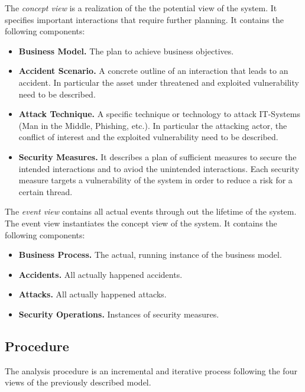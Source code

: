 The \emph{concept view} is a realization of the the potential view of the system.
It specifies important interactions that require further planning.
It contains the following components:
\begin{itemize}
\item \textbf{Business Model.}
The plan to achieve business objectives.

\item \textbf{Accident Scenario.}
A concrete outline of an interaction that leads to an accident.
In particular the asset under threatened and exploited vulnerability need to be described.

\item \textbf{Attack Technique.}
A specific technique or technology to attack IT-Systems (Man in the Middle, Phishing, etc.).
In particular the attacking actor, the conflict of interest and the exploited vulnerability need to be described.

\item \textbf{Security Measures.}
It describes a plan of sufficient measures to secure the intended interactions and to aviod the unintended interactions.
Each security measure targets a vulnerability of the system in order to reduce a risk for a certain thread.
\end{itemize}




The \emph{event view} contains all actual events through out the lifetime of the system.
The event view instantiates the concept view of the system.
It contains the following components:
\begin{itemize}
\item \textbf{Business Process.}
The actual, running instance of the business model.

\item \textbf{Accidents.}
All actually happened accidents.

\item \textbf{Attacks.}
All actually happened attacks.

\item \textbf{Security Operations.}
Instances of security measures.
\end{itemize}




\subsection{Procedure}

The analysis procedure is an incremental and iterative process following the four views of the previously described model.

